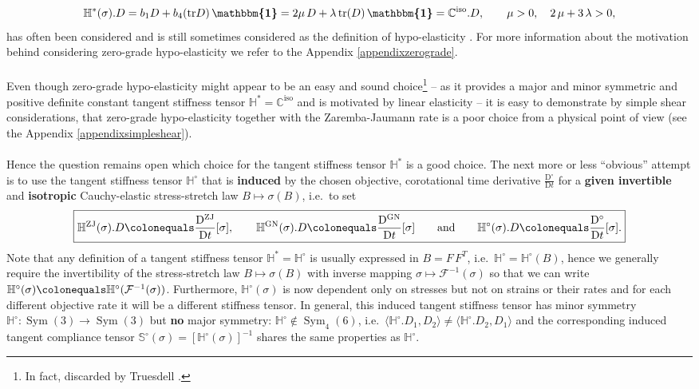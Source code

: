 \documentclass[10pt]{article}
\numberwithin{theoremCounter}{section}
\theoremstyle{plain}
\theoremstyle{definition}
\newcommand{\id}{{\boldsymbol{\mathbbm{1}}}}
\newcommand{\DD}{\mathrm{D}}
\DeclareMathOperator{\Sym}{Sym}
\DeclareMathOperator{\tr}{tr}
\DeclareMathOperator{\iso}{iso}
\DeclareMathOperator{\ZJ}{ZJ}
\DeclareMathOperator{\GN}{GN}
\def\tr{\textnormal{tr}}
\def\C{\mathbb{C}}
\def\H{\mathbb{H}}
\numberwithin{equation}{section}
\begin{document}
	\begin{align}
	\H^{*}(\sigma).D = b_1 D + b_4(\tr D) \, \id = 2\mu \, D + \lambda \, \tr(D) \, \id = \C^{\iso} . D, \qquad \mu > 0, \quad 2 \, \mu + 3 \, \lambda > 0,
	\end{align}
has often been considered and is still sometimes considered as the definition of hypo-elasticity \cite{LIN2003443}. For more information about the motivation behind considering zero-grade hypo-elasticity we refer to the Appendix \ref{appendixzerograde}. \\
\\
Even though zero-grade hypo-elasticity might appear to be an easy and sound choice\footnote
{
In fact, discarded by Truesdell \cite[p.405]{Truesdell65}.
}
-- as it provides a major and minor symmetric and positive definite constant tangent stiffness tensor $\H^* = \C^{\iso}$ and is motivated by linear elasticity -- it is easy to demonstrate by simple shear considerations, that zero-grade hypo-elasticity together with the Zaremba-Jaumann rate is a poor choice from a physical point of view (see the Appendix \ref{appendixsimpleshear}). \\
\\
Hence the question remains open which choice for the tangent stiffness tensor $\H^*$ is a good choice. The next more or less \enquote{obvious} attempt is to use the tangent stiffness tensor $\H^{\circ}$ that is \textbf{induced} by the chosen objective, corotational time derivative $\frac{\DD^{\circ}}{\DD t}$ for a \textbf{given invertible} and \textbf{isotropic} Cauchy-elastic stress-stretch law $B \mapsto \sigma(B)$, i.e.~to set
	\begin{align}
	\label{eqdefZJ}
	\boxed{\H^{\ZJ}(\sigma).D \colonequals \frac{\DD^{\ZJ}}{\DD t}[\sigma],\qquad \H^{\GN}(\sigma).D \colonequals \frac{\DD^{\GN}}{\DD t}[\sigma] \qquad \text{and} \qquad \H^{\circ}(\sigma).D \colonequals \frac{\DD^{\circ}}{\DD t}[\sigma].}
	\end{align}
Note that any definition of a tangent stiffness tensor $\H^* = \H^{\circ}$ is usually expressed in $B = F \, F^T$, i.e.\ $\H^{\circ} = \H^{\circ}(B)$, hence we generally require the invertibility of the stress-stretch law $B \mapsto \sigma(B)$ with inverse mapping $\sigma \mapsto \mathcal{F}^{-1}(\sigma)$ so that we can write $\H^{\circ}(\sigma)\colonequals \H^{\circ}(\mathcal{F}^{-1}(\sigma))$. Furthermore, $\H^{\circ}(\sigma)$ is now dependent only on stresses but not on strains or their rates and for each different objective rate it will be a different stiffness tensor. In general, this induced tangent stiffness tensor has minor symmetry $\H^{\circ}\colon \Sym(3) \to \Sym(3)$ but \textbf{no} major symmetry: $\H^{\circ} \notin \Sym_4(6)$, i.e.~$\langle \H^\circ.D_1, D_2 \rangle \neq \langle \H^{\circ}.D_2, D_1 \rangle$ and the corresponding induced tangent compliance tensor $\mathbb{S}^{\circ}(\sigma) = [\H^{\circ}(\sigma)]^{-1}$ shares the same properties as $\H^{\circ}$. \\
\end{document}
